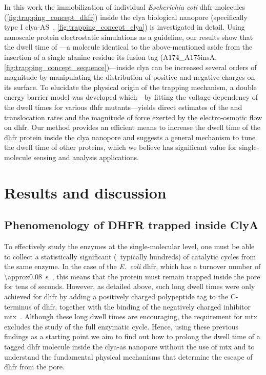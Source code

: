 In this work the immobilization of individual \textit{Escherichia coli} \gls{dhfr} molecules
(\cref{fig:trapping_concept_dhfr}) inside the \gls{clya} biological nanopore (specifically type I
\gls{clya}-AS~\cite{Soskine-2013}, \cref{fig:trapping_concept_clya}) is investigated in detail. Using
nanoscale protein electrostatic simulations as a guideline, our results show that the dwell time of
---a molecule identical to the above-mentioned \DHFRt{} aside from the insertion of a single
alanine residue its fusion tag (A174\_A175insA, \cref{fig:trapping_concept_sequence})---inside \gls{clya} can
be increased several orders of magnitude by manipulating the distribution of positive and negative charges on
its surface. To elucidate the physical origin of the trapping mechanism, a double energy barrier model was
developed which---by fitting the voltage dependency of the dwell times for various \gls{dhfr} mutants---yields
direct estimates of the \cisi{} and \transi{} translocation rates and the magnitude of force exerted by the
electro-osmotic flow on \gls{dhfr}\@. Our method provides an efficient means to increase the dwell time of the
\gls{dhfr} protein inside the \gls{clya} nanopore and suggests a general mechanism to tune the dwell time of
other proteins, which we believe has significant value for single-molecule sensing and analysis applications.


%
\section{Results and discussion}
%
\label{sec:trapping:results_discussion}
%

\subsection{Phenomenology of {DHFR} trapped inside {ClyA}}
%

To effectively study the enzymes at the single-molecular level, one must be able to collect a statistically
significant (\ie~typically hundreds) of catalytic cycles from the same enzyme. In the case of the
\textit{E.~coli} \gls{dhfr}, which has a turnover number of \SI{\approx0.08}{\second}~\cite{Kohen-2015}, this
means that the protein must remain trapped inside the pore for tens of seconds. However, as detailed above,
such long dwell times were only achieved for \gls{dhfr} by adding a positively charged polypeptide tag to the
C-terminus of \gls{dhfr}, together with the binding of the negatively charged inhibitor
\gls{mtx}~\cite{Soskine-Biesemans-2015}. Although these long dwell times are encouraging, the requirement for
\gls{mtx} excludes the study of the full enzymatic cycle. Hence, using these previous findings as a starting
point we aim to find out how to prolong the dwell time of a tagged \gls{dhfr} molecule inside the
\gls{clya-as} nanopore without the use of \gls{mtx} and to understand the fundamental physical mechanisms that
determine the escape of \gls{dhfr} from the pore.

